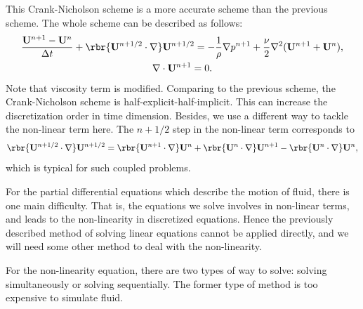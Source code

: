 \documentclass[english, nochinese]{pkupaper}
\begin{document}
This Crank-Nicholson scheme is a more accurate scheme than the previous scheme. The whole scheme can be described as follows:
\begin{equation}
\begin{gathered}
\frac{\mathbf{U}^{n+1} - \mathbf{U}^n}{\Delta t} + \rbr{\mathbf{U}^{n+1/2}\cdot\nabla} \mathbf{U}^{n+1/2} = - \frac{1}{\rho} \nabla p^{n+1} +  \frac{\nu}{2}\nabla^2(\mathbf{U}^{n+1} + \mathbf{U}^n), \\
\nabla\cdot \mathbf{U}^{n+1} = 0.
\end{gathered}
\end{equation}
Note that viscosity term is modified. Comparing to the previous scheme, the Crank-Nicholson scheme is half-explicit-half-implicit. This can increase the discretization order in time dimension. Besides, we use a different way to tackle the non-linear term here. The $n+1/2$ step in the non-linear term corresponds to
\begin{equation}
\rbr{\mathbf{U}^{n+1/2}\cdot\nabla}\mathbf{U}^{n+1/2} = \rbr{\mathbf{U}^{n+1}\cdot\nabla}\mathbf{U}^n +\rbr{\mathbf{U}^n\cdot\nabla}\mathbf{U}^{n+1} - \rbr{\mathbf{U}^n\cdot\nabla}\mathbf{U}^n,
\end{equation}
which is typical for such coupled problems.



For the partial differential equations which describe the motion of fluid, there is one main difficulty. That is, the equations we solve involves in non-linear terms, and leads to the non-linearity in discretized equations. Hence the previously described method of solving linear equations cannot be applied directly, and we will need some other method to deal with the non-linearity.


For the non-linearity equation, there are two types of way to solve: solving simultaneously or solving sequentially. The former type of method is too expensive to simulate fluid. 
\end{document}
